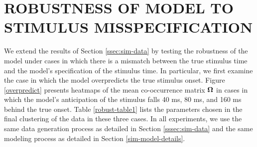 \documentclass[twoside]{article}
\begin{document}
\section{ROBUSTNESS OF MODEL TO STIMULUS MISSPECIFICATION} \label{sim-robust}
We extend the results of Section \ref{ssec:sim-data} by testing the robustness of the model under cases in which there is a mismatch between the true stimulus time and the model's specification of the stimulus time.  In particular, we first examine the case in which the model overpredicts the true stimulus onset.  Figure \ref{overpredict} presents heatmaps of the mean co-occurrence matrix $\boldsymbol{\Omega}$ in cases in which the model's anticipation of the stimulus falls 40 ms, 80 ms, and 160 ms behind the true onset.  Table \ref{robust-table1} lists the parameters chosen in the final clustering of the data in these three cases.  In all experiments, we use the same data generation process as detailed in Section \ref{sssec:sim-data} and the same modeling process as detailed in Section \ref{sim-model-details}.  
\end{document}

